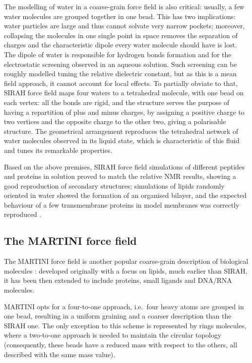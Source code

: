 The modelling of water in a coarse-grain force field is also critical: usually, a few water molecules are grouped together in one bead. This has two implications: water particles are large and thus cannot solvate very narrow pockets; moreover, collapsing the molecules in one single point in space removes the separation of charges and the characteristic dipole every water molecule should have is lost. The dipole of water is responsible for hydrogen bonds formation and for the electrostatic screening observed in an aqueous solution. Such screening can be roughly modelled tuning the relative dielectric constant, but as this is a mean field approach, it cannot account for local effects.
%
To partially obviate to that, SIRAH force field maps four waters to a tetrahedral molecule, with one bead on each vertex: all the bonds are rigid, and the structure serves the purpose of having a repartition of plus and minus charges, by assigning a positive charge to two vertices and the opposite charge to the other two, giving a polarisable structure. The geometrical arrangement reproduces the tetrahedral network of water molecules observed in its liquid state, which is characteristic of this fluid and tunes its remarkable properties.

Based on the above premises, SIRAH force field simulations of different peptides and proteins in solution proved to match the relative NMR results, showing a good reproduction of secondary structures; simulations of lipids randomly oriented in water showed the formation of an organised bilayer, and the expected behaviour of a few transmembrane proteins in model membranes was correctly reproduced \citep{Machado2018,Barrera2019}.

 
\subsection{The MARTINI force field}
The MARTINI force field is another popular coarse-grain description of biological molecules \citep{Marrink2007,Monticelli2008,DeJong2013}: developed originally with a focus on lipids, much earlier than SIRAH, it has been then extended to include proteins, small ligands and DNA/RNA molecules.

MARTINI opts for a four-to-one approach, i.e.\ four heavy atoms are grouped in one bead, resulting in a uniform graining and a coarser description than the SIRAH one. The only exception to this scheme is represented by rings molecules, where a two-to-one approach is needed to maintain the circular topology (consequently, these beads have a reduced mass with respect to the others, all described with the same mass value).

